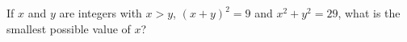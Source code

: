 If $x$ and $y$ are integers with $x>y$, $(x+y)^2=9$ and $x^2+y^2=29$, what is the smallest possible value of $x$?
